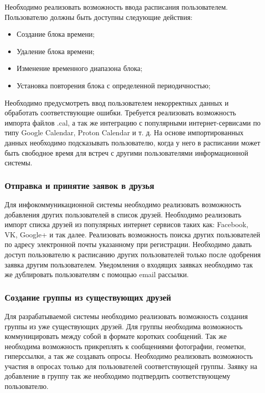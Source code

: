 \documentclass[14pt]{extreport}
\begin{document}
                Необходимо реализовать возможность ввода расписания пользователем. Пользователю должны быть доступны следующие действия: 
                \begin{itemize}
                    \item Создание блока времени;
                    \item Удаление блока времени;
                    \item Изменение временного диапазона блока;
                    \item Установка повторения блока с определенной периодичностью;
                \end{itemize}

                Необходимо предусмотреть ввод пользователем некорректных данных и обработать соответствующие ошибки. Требуется реализовать возможность импорта файлов .cal, а так же интеграцию с популярными интернет-сервисами по типу Google Calendar, Proton Calendar и т. д. На основе импортированных данных необходимо подсказывать пользователю, когда у него в расписании может быть свободное время для встреч с другими пользователями информационной системы. 

            \subsubsection{Отправка и принятие заявок в друзья} 
                Для инфокоммуникационной системы необходимо реализовать возможность добавления других пользователей в список друзей. Необходимо реализовать импорт списка друзей из популярных интернет сервисов таких как: Facebook, VK, Google+ и так далее. Реализовать возможность поиска других пользователей по адресу электронной почты указанному при регистрации. Необходимо давать доступ пользователю к расписанию других пользователей только после одобрения заявка другим пользователем. Уведомления о входящих заявках необходимо так же дублировать пользователям с помощью email рассылки. 

            \subsubsection{Создание группы из существующих друзей}
                Для разрабатываемой системы необходимо реализовать возможность создания группы из уже существующих друзей. Для группы необходима возможность коммуницировать между собой в формате коротких сообщений. Так же необходима возможность прикреплять к сообщениями фотографии, геометки, гиперссылки, а так же создавать опросы. Необходимо реализовать возможность участия в опросах только для пользователей соответствующей группы. Заявку на добавление в группу так же необходимо подтвердить соответствующему пользователю. 
\end{document}
